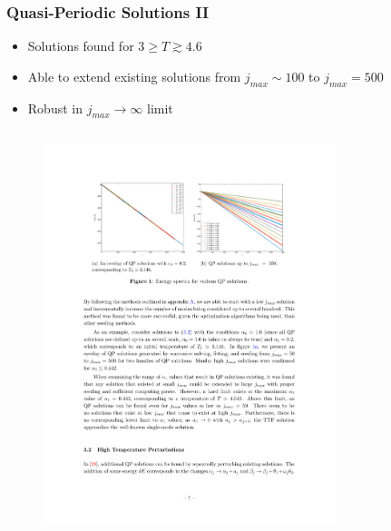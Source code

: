 \documentclass[mathserif,10pt]{beamer}
\newcommand{\bi}{\begin{itemize}}
\newcommand{\ei}{\end{itemize}}
\newcommand{\its}{\item}
\newcommand{\jm}{j_{max}}
\begin{document}
\frame
{
  \frametitle{Quasi-Periodic Solutions II}
  \bi
  \its Solutions found for $3 \geq T \gtrsim 4.6$
  \its Able to extend existing solutions from $\jm \sim 100$ to $\jm = 500$
  \its Robust in $\jm \to \infty$ limit
  \ei
  
  \vspace{-0.1in}
  \begin{columns}
  \begin{figure}
  \centering
  \includegraphics[scale=0.75]{largejmax} 
  \end{figure}
  \begin{figure}
  \centering

\end{figure}
\end{columns}}
\end{document}
